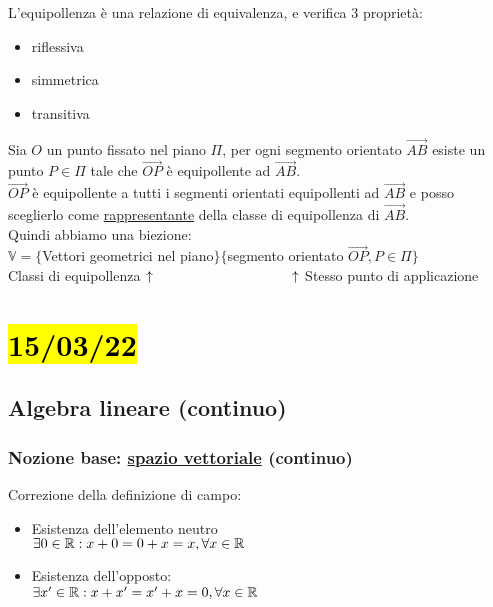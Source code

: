 \documentclass{article}
\begin{document}
\vspace*{2em}
L'equipollenza è una relazione di equivalenza, e verifica 3 proprietà:
\begin{itemize}
	\item riflessiva
	\item simmetrica
	\item transitiva
\end{itemize}
{Sia $O$ un punto fissato nel piano $\Pi$, per ogni segmento orientato $\vec{AB}$ esiste un punto $P\in\Pi$ tale che $\vec{OP}$ è equipollente ad $\vec{AB}$.\\
	$\vec{OP}$ è equipollente a tutti i segmenti orientati equipollenti ad $\vec{AB}$ e posso sceglierlo come \ul{rappresentante} della classe di equipollenza di $\vec{AB}$.\\
	Quindi abbiamo una biezione:\\
	$\mathbb{V}=\{$Vettori geometrici nel piano$\}\{$segmento orientato $\vec{OP},P\in\Pi\}$\\
	Classi di equipollenza $\uparrow\hspace*{10em}\uparrow$ Stesso punto di applicazione}
\section{\hl{15/03/22}}
\subsection*{Algebra lineare (continuo)}
\subsubsection*{Nozione base: \ul{spazio vettoriale} (continuo)}
Correzione della definizione di campo:
\begin{itemize}
	\item Esistenza dell'elemento neutro\\$\exists0\in\mathbb{R}:x+0=0+x=x,\forall x\in\mathbb{R}$
	\item Esistenza dell'opposto:\\$\exists x'\in\mathbb{R}:x+x'=x'+x=0,\forall x\in\mathbb{R}$
\end{itemize}
\hrulefill
\end{document}
